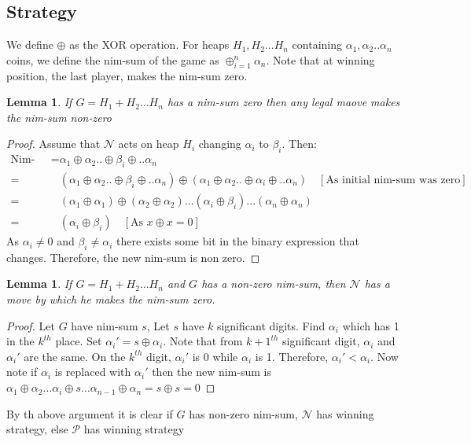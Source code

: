 \documentclass[12pt,oneside]{book}
\newtheorem{lemma}[theorem]{Lemma}
\begin{document}
\subsection{Strategy}
We define $\oplus$ as the XOR operation. For heaps $H_1,H_2...H_n$ containing $\alpha_1,\alpha_2..\alpha_n$ coins, we define the nim-sum of the game as $\oplus_{i=1}^n\alpha_n$. Note that at winning position, the last player, makes the nim-sum zero. 
\begin{lemma}
    If $G=H_1+H_2\hdots H_n$ has a nim-sum zero then any legal maove makes the nim-sum non-zero 
\end{lemma}
\begin{proof}
    Assume that $\mathcal{N}$ acts on heap $H_i$ changing $\alpha_i$ to $\beta_i$. Then:
    \begin{align*}
        \text{Nim-Sum}=&\alpha_1\oplus\alpha_2..\oplus\beta_i\oplus..\alpha_n\\
        =&(\alpha_1\oplus\alpha_2..\oplus\beta_i\oplus..\alpha_n)\oplus(\alpha_1\oplus\alpha_2..\oplus\alpha_i\oplus..\alpha_n)\quad[\text{As initial nim-sum was zero}]\\
        =&(\alpha_1\oplus\alpha_1)\oplus(\alpha_2\oplus\alpha_2)...(\alpha_i\oplus\beta_i)...(\alpha_n\oplus\alpha_n)\\
        =&(\alpha_i\oplus\beta_i)\quad[\text{As $x\oplus x=0$}]
    \end{align*}
    As $\alpha_i\ne0$ and $\beta_i\ne \alpha_i$ there exists some bit in the binary expression that changes. Therefore, the new nim-sum is non zero.
\end{proof}
\begin{lemma}
    If $G=H_1+H_2\hdots H_n$ and $G$ has a non-zero nim-sum, then $\mathcal N$ has a move by which he makes the nim-sum zero.
\end{lemma}
\begin{proof}
    Let $G$ have nim-sum $s$, Let $s$ have $k$ significant digits. Find $\alpha_i$ which has 1 in the $k^{th}$ place. Set $\alpha_i'=s\oplus\alpha_i$. Note that from $k+1^{th}$ significant digit, $\alpha_i$ and $\alpha_i'$ are the same. On the $k^{th}$ digit, $\alpha_i'$ is 0 while $\alpha_i$ is 1. Therefore, $\alpha_i'<\alpha_i$. Now note if $\alpha_i$ is replaced with $\alpha_i'$ then the new nim-sum is $\alpha_1\oplus\alpha_2\hdots \alpha_i\oplus s\hdots \alpha_{n-1}\oplus\alpha_n=s\oplus s=0$ 
\end{proof}

By th above argument it is clear if $G$ has non-zero nim-sum, $\mathcal{N}$ has winning strategy, else $\mathcal{P}$ has winning strategy
\end{document}
